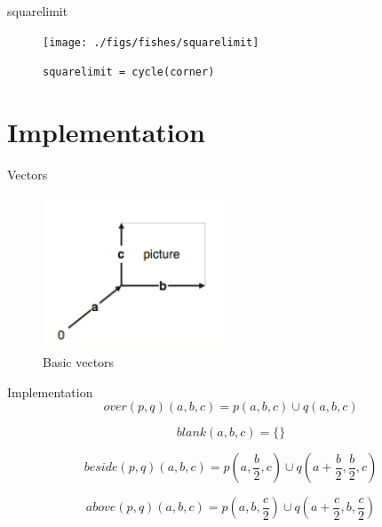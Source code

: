 \documentclass{beamer}
\begin{document}
    \begin{frame}{squarelimit}

        \begin{figure}
            \centering
            \texttt{[image: ./figs/fishes/squarelimit]}
            \caption{\texttt{squarelimit = cycle(corner)}\label{fig:squarelimit}}
        \end{figure}

    \end{frame}

    \section{Implementation}

    \begin{frame}{Vectors}
        \begin{figure}
            \centering
            \includegraphics[width=0.5\textwidth]{./figs/vectors}
            \caption{Basic vectors\label{fig:vectors}}
        \end{figure}
    \end{frame}

    \begin{frame}{Implementation}
        \begin{equation*}
        over(p, q)(a, b, c) = p(a, b, c) \cup q(a, b, c)
        \end{equation*}

        \begin{equation*}
        blank(a, b, c) = \text{\{\}}
        \end{equation*}

        \begin{equation*}
        beside(p, q)(a, b, c) = p(a, \frac{b}{2}, c) \cup q(a + \frac{b}{2}, \frac{b}{2}, c)
        \end{equation*}

        \begin{equation*}
        above(p, q)(a, b, c) = p(a, b, \frac{c}{2}) \cup q (a + \frac{c}{2}, b, \frac{c}{2})
        \end{equation*}
    \end{frame}
\end{document}
